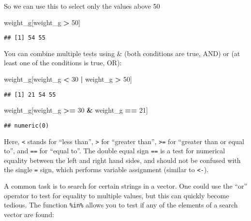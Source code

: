\documentclass[]{book}
\newenvironment{Shaded}{\begin{snugshade}}{\end{snugshade}}
\newcommand{\DecValTok}[1]{\textcolor[rgb]{0.00,0.00,0.81}{#1}}
\newcommand{\NormalTok}[1]{#1}
\newcommand{\OperatorTok}[1]{\textcolor[rgb]{0.81,0.36,0.00}{\textbf{#1}}}
\newcommand{\StringTok}[1]{\textcolor[rgb]{0.31,0.60,0.02}{#1}}
\begin{document}
So we can use this to select only the values above 50

\begin{Shaded}
\begin{Highlighting}[]
\NormalTok{weight_g[weight_g }\OperatorTok{>}\StringTok{ }\DecValTok{50}\NormalTok{]}
\end{Highlighting}
\end{Shaded}

\begin{verbatim}
## [1] 54 55
\end{verbatim}

You can combine multiple tests using \& (both conditions are true, AND) or \textbar{} (at least one of the conditions is true, OR):

\begin{Shaded}
\begin{Highlighting}[]
\NormalTok{weight_g[weight_g }\OperatorTok{<}\StringTok{ }\DecValTok{30} \OperatorTok{|}\StringTok{ }\NormalTok{weight_g }\OperatorTok{>}\StringTok{ }\DecValTok{50}\NormalTok{]}
\end{Highlighting}
\end{Shaded}

\begin{verbatim}
## [1] 21 54 55
\end{verbatim}

\begin{Shaded}
\begin{Highlighting}[]
\NormalTok{weight_g[weight_g }\OperatorTok{>=}\StringTok{ }\DecValTok{30} \OperatorTok{&}\StringTok{ }\NormalTok{weight_g }\OperatorTok{==}\StringTok{ }\DecValTok{21}\NormalTok{]}
\end{Highlighting}
\end{Shaded}

\begin{verbatim}
## numeric(0)
\end{verbatim}

Here, \texttt{\textless{}} stands for ``less than'', \texttt{\textgreater{}} for ``greater than'', \texttt{\textgreater{}=} for ``greater than or equal to'', and \texttt{==} for ``equal to''. The double equal sign \texttt{==} is a test for numerical equality between the left and right hand sides, and should not be confused with the single \texttt{=} sign, which performs variable assignment (similar to \texttt{\textless{}-}).

A common task is to search for certain strings in a vector. One could use the ``or'' operator \texttt{\textbar{}} to test for equality to multiple values, but this can quickly become tedious. The function \texttt{\%in\%} allows you to test if any of the elements of a search vector are found:
\end{document}
